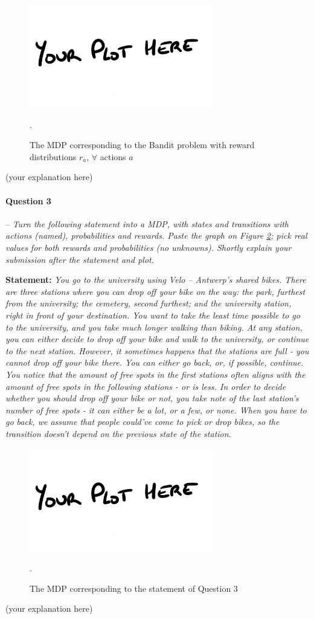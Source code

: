 \documentclass[a4paper]{article}
\newcommand{\question}[2]{
\paragraph{Question #1} -- \textit{#2}

}
\begin{document}
			\begin{figure}[H]
				\centering
				\includegraphics[width=8cm]{plots/your_plot_here.png}
				\caption{The MDP corresponding to the Bandit problem with reward distributions $r_a$, $\forall$ actions $a$}.
				\label{fig:bandit_mdp}
			\end{figure}{}
			(your explanation here)


		\question{3}{Turn the following statement into a MDP, with states and transitions with actions (named), probabilities and rewards. 
				Paste the graph on Figure \ref{fig:q3}; pick real values for both rewards and probabilities (no unknowns). 
				Shortly explain your submission after the statement and plot.}

			\textbf{Statement:}  \emph{You go to the university using Velo -- Antwerp's shared bikes. 
				There are three stations where you can drop off your bike on the way: the park, furthest from the university; the cemetery, second furthest; and the university station, right in front of your destination.
				You want to take the least time possible to go to the university, and you take much longer walking than biking.
				At any station, you can either decide to drop off your bike and walk to the university, or continue to the next station.
				However, it sometimes happens that the stations are full - you cannot drop off your bike there. You can either go back, or, if possible, continue.
				You notice that the amount of free spots in the first stations often aligns with the amount of free spots in the following stations - or is less. 
				In order to decide whether you should drop off your bike or not, you take note of the last station's number of free spots - it can either be a lot, or a few, or none.
				When you have to go back, we assume that people could've come to pick or drop bikes, so the transition doesn't depend on the previous state of the station.}

			\begin{figure}[H]
				\centering
				\includegraphics[width=8cm]{plots/your_plot_here.png}
				\caption{The MDP corresponding to the statement of Question 3}.
				\label{fig:q3}
			\end{figure}{}
			(your explanation here)
\end{document}
